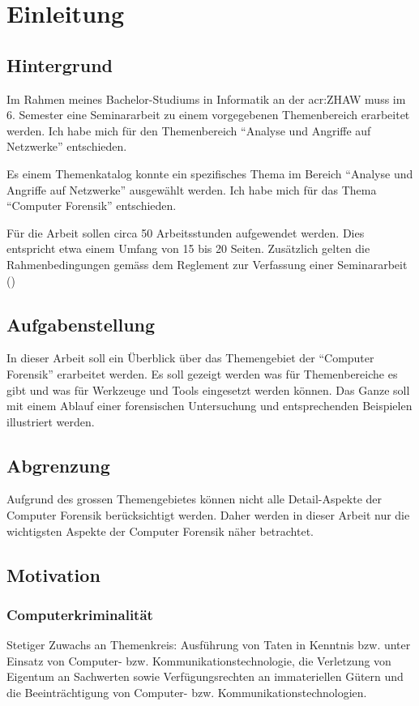 
\chapter{Einleitung}

\section{Hintergrund}
Im Rahmen meines Bachelor-Studiums in Informatik an der \gls{acr:ZHAW} muss im 6. Semester eine Seminararbeit zu einem vorgegebenen Themenbereich erarbeitet werden. Ich habe mich für den Themenbereich "`Analyse und Angriffe auf Netzwerke"' entschieden.

Es einem Themenkatalog konnte ein spezifisches Thema im Bereich "`Analyse und Angriffe auf Netzwerke"' ausgewählt werden. Ich habe mich für das Thema "`Computer Forensik"' entschieden.

Für die Arbeit sollen circa 50 Arbeitsstunden aufgewendet werden. Dies entspricht etwa einem Umfang von 15 bis 20 Seiten. Zusätzlich gelten die Rahmenbedingungen gemäss dem Reglement zur Verfassung einer Seminararbeit (\cite{ZHAW:2012:Seminararbeit:Reglemente})

\section{Aufgabenstellung}
In dieser Arbeit soll ein Überblick über das Themengebiet der "`Computer Forensik"' erarbeitet werden. Es soll gezeigt werden was für Themenbereiche es gibt und was für Werkzeuge und Tools eingesetzt werden können. Das Ganze soll mit einem Ablauf einer forensischen Untersuchung und entsprechenden Beispielen illustriert werden.

\section{Abgrenzung}
Aufgrund des grossen Themengebietes können nicht alle Detail-Aspekte der Computer Forensik berücksichtigt werden. Daher werden in dieser Arbeit nur die wichtigsten Aspekte der Computer Forensik näher betrachtet.


\section{Motivation}
\subsection{Computerkriminalität}
Stetiger Zuwachs an
Themenkreis: Ausführung von Taten in Kenntnis bzw. unter Einsatz von Computer- bzw. Kommunikationstechnologie, die Verletzung von Eigentum an Sachwerten sowie Verfügungsrechten an immateriellen Gütern und die Beeinträchtigung von Computer- bzw. Kommunikationstechnologien.

